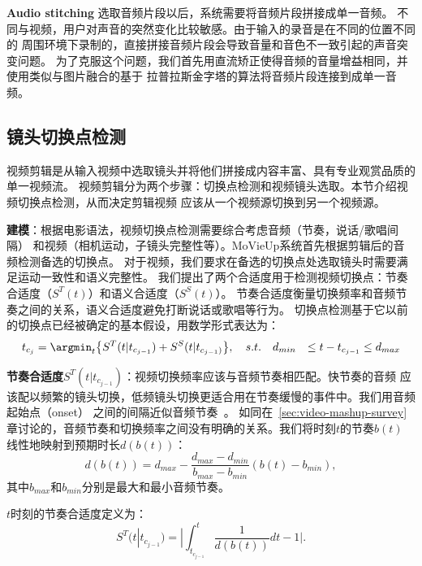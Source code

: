 \textbf{Audio stitching} 选取音频片段以后，系统需要将音频片段拼接成单一音频。
不同与视频，用户对声音的突然变化比较敏感。由于输入的录音是在不同的位置不同的
周围环境下录制的，直接拼接音频片段会导致音量和音色不一致引起的声音突变问题。
为了克服这个问题，我们首先用直流矫正使得音频的音量增益相同，并使用类似与图片融合的基于
拉普拉斯金字塔的算法将音频片段连接到成单一音频。

\subsection{镜头切换点检测}
\label{sec:mashup-cutpoint}
视频剪辑是从输入视频中选取镜头并将他们拼接成内容丰富、具有专业观赏品质的单一视频流。
视频剪辑分为两个步骤：切换点检测和视频镜头选取。本节介绍视频切换点检测，从而决定剪辑视频
应该从一个视频源切换到另一个视频源。

\textbf{建模}：根据电影语法，视频切换点检测需要综合考虑音频（节奏，说话/歌唱间隔）
和视频（相机运动，子镜头完整性等）。MoVieUp系统首先根据剪辑后的音频检测备选的切换点。
对于视频，我们要求在备选的切换点处选取镜头时需要满足运动一致性和语义完整性。
我们提出了两个合适度用于检测视频切换点：节奏合适度（$S^T(t)$）和语义合适度（$S^S(t)$）。
节奏合适度衡量切换频率和音频节奏之间的关系，语义合适度避免打断说话或歌唱等行为。
切换点检测基于它以前的切换点已经被确定的基本假设，用数学形式表达为：
\begin{equation}
	\begin{aligned}
		t_{c_j} = \argmin_{t}&\big\{{S^T(t|t_{c_{j-1}}) +
		S^S(t|t_{c_{j-1})}}\big\}, \quad s.t. \quad
		d_{min} &\leq t - t_{c_{j-1}} \leq d_{max}
	\end{aligned}
	\label{equ:mashup-cut-pint-detection}
\end{equation}

\textbf{节奏合适度$S^T(t|t_{c_{j-1}})$}：视频切换频率应该与音频节奏相匹配。快节奏的音频
应该配以频繁的镜头切换，低频镜头切换更适合用在节奏缓慢的事件中。我们用音频起始点（onset）
之间的间隔近似音频节奏~\cite{DBLP:conf/mm/HuaLZ03,stowell2007adaptive}。
如同在~\ref{sec:video-mashup-survey}章讨论的，音频节奏和切换频率之间没有明确的关系。我们将时刻$t$的节奏$b(t)$
线性地映射到预期时长$d(b(t))$：
\begin{equation}
	d(b(t)) = d_{max} - \frac{d_{max} - d_{min}}{b_{max} - b_{min}} (b(t) - b_{min}),
\end{equation}
其中$b_{max}$和$b_{min}$分别是最大和最小音频节奏。

$t$时刻的节奏合适度定义为：
\begin{equation}
	S^T(t|t_{c_{j-1}}) = |\int_{t_{c_{j-1}}}^{t}{\frac{1}{d(b(t))}dt} - 1|.
\end{equation}

